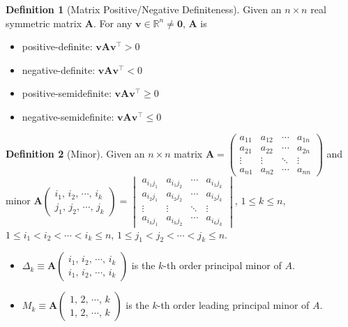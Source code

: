 \documentclass[10pt]{extarticle}
\newcommand{\ds}{\displaystyle}
\theoremstyle{definition}
\newtheorem*{dfn}{Definition}
\newcommand{\vv}{\mathbf{v}}
\newcommand{\vA}{\mathbf{A}}
\newcommand{\vZero}{\mathbf{0}}
\begin{document}
\begin{dfn}[Matrix Positive/Negative Definiteness] 
  Given an $n\times n$ real symmetric matrix $\vA$. For any $\ds\vv\in\mathbb{R}^n\ne\vZero$, $\vA$ is
  \begin{itemize}%
    \item positive-definite: $\ds\vv\vA\vv^\top > 0$ 
    \item negative-definite: $\ds\vv\vA\vv^\top < 0$
    \item positive-semidefinite: $\ds\vv\vA\vv^\top\geqslant 0$
    \item negative-semidefinite: $\ds\vv\vA\vv^\top\leqslant 0$
  \end{itemize}
\end{dfn}

\begin{dfn}[Minor] 
  Given an $n\times n$ matrix $\ds\vA = \begin{pmatrix}a_{11} & a_{12} & \cdots & a_{1n} \\ a_{21} & a_{22} & \cdots & a_{2n} \\ \vdots & \vdots & \ddots & \vdots \\ a_{n1} & a_{n2} & \cdots & a_{nn} \end{pmatrix}$ and minor $\ds\vA\begin{pmatrix}i_1,\,i_2,\,\cdots,\,i_k\\j_1,\,j_2,\,\cdots,\,j_k\end{pmatrix} = \begin{vmatrix}a_{i_1 j_1} & a_{i_1 j_2} & \cdots & a_{i_1 j_k} \\ a_{i_2 j_1} & a_{i_2 j_2} & \cdots & a_{i_2 j_k} \\ \vdots & \vdots & \ddots & \vdots \\ a_{i_k j_1} & a_{i_k j_2} & \cdots & a_{i_k j_k} \end{vmatrix}$, $1\leqslant k\leqslant n$, $1\leqslant i_1 < i_2 < \cdots < i_k \leqslant n$, $1\leqslant j_1 < j_2 < \cdots < j_k \leqslant n$. 
  \begin{itemize}%
    \item $\ds\Delta_k\equiv\vA\begin{pmatrix}i_1,\,i_2,\,\cdots,\,i_k\\i_1,\,i_2,\,\cdots,\,i_k\end{pmatrix}$ is the $k$-th order principal minor of $A$. 
    \item $\ds M_k\equiv\vA\begin{pmatrix}1,\,2,\,\cdots,\,k\\1,\,2,\,\cdots,\,k\end{pmatrix}$ is the $k$-th order leading principal minor of $A$. 
  \end{itemize}
\end{dfn}
\end{document}
